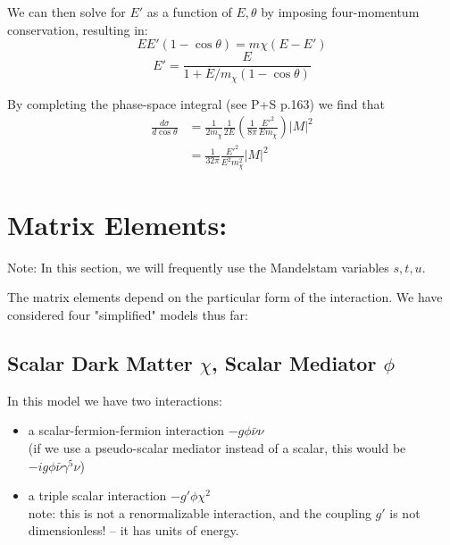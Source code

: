\documentclass[11pt, oneside]{article}   	%
\begin{document}
We can then solve for $E'$ as a function of $E, \theta$ by imposing four-momentum conservation, resulting in: 
\[ EE'(1-\cos\theta) = m\chi(E-E') \] 
\[ E' = \frac{E}{1 + E/m_\chi (1-\cos\theta)} \] 

By completing the phase-space integral (see P+S p.163) we find that
\begin{align*}
    \frac{d\sigma}{d\cos\theta} &= \frac{1}{2m_\chi} \frac{1}{2E} (\frac{1}{8\pi} \frac{E'^2}{Em_\chi}) \left| M \right|^2 \\
    &= \frac{1}{32\pi} \frac{E'^2}{E^2m_\chi^2} \left| M \right|^2
\end{align*}

\newpage
\section{\large Matrix Elements:}

Note: In this section, we will frequently use the Mandelstam variables $s, t, u$.

The matrix elements depend on the particular form of the interaction. We have considered four "simplified" models thus far: 

\subsection{\normalsize Scalar Dark Matter $\chi$, Scalar Mediator $\phi$ } 

In this model we have two interactions: 
\begin{itemize}
    \item a scalar-fermion-fermion interaction $-g\phi \bar{\nu} \nu$ \\ (if we use a pseudo-scalar mediator instead of a scalar, this would be $-ig\phi \bar{\nu} \gamma^5 \nu$) 
    \item a triple scalar interaction $-g'\phi \chi^2$ \\ note: this is not a renormalizable interaction, and the coupling $g'$ is not dimensionless! -- it has units of energy.
\end{itemize}
\end{document}

